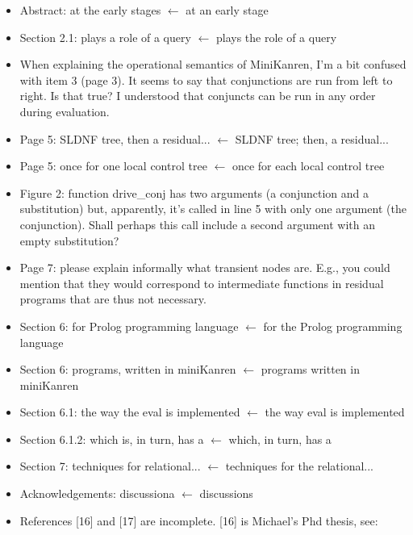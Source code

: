 \begin{itemize}
  \item Abstract: at the early stages $\leftarrow$ at an early stage
  \item Section 2.1: plays a role of a query $\leftarrow$ plays the role of a query
  \item When explaining the operational semantics of MiniKanren, I'm a bit
  confused with item 3 (page 3). It seems to say that conjunctions are
  run from left to right. Is that true? I understood that conjuncts
  can be run in any order during evaluation.

  \item Page 5: SLDNF tree, then a residual... $\leftarrow$ SLDNF tree; then, a residual...
  \item Page 5: once for one local control tree $\leftarrow$ once for each local control tree
  \item Figure 2: function drive_conj has two arguments (a conjunction
  and a substitution) but, apparently, it's called in line 5 with only
  one argument (the conjunction). Shall perhaps this call include a second
  argument with an empty substitution?

  \item Page 7: please explain informally what transient nodes are. E.g., you
  could mention that they would correspond to intermediate functions in
  residual programs that are thus not necessary.
  \item Section 6: for Prolog programming language $\leftarrow$ for the Prolog
  programming language
  \item Section 6: programs, written in miniKanren $\leftarrow$ programs written in miniKanren
  \item Section 6.1: the way the eval is implemented $\leftarrow$ the way eval is implemented
  \item Section 6.1.2: which is, in turn, has a $\leftarrow$ which, in turn, has a
  \item Section 7: techniques for relational... $\leftarrow$ techniques for the relational...
  \item Acknowledgements: discussiona $\leftarrow$ discussions
  \item References [16] and [17] are incomplete. [16] is Michael's Phd thesis, see:


\end{itemize}
